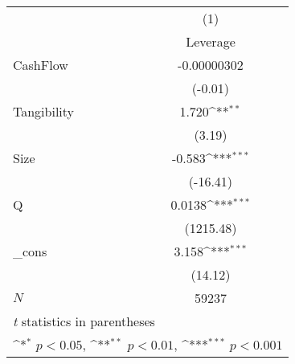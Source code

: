 {
\def\sym#1{\ifmmode^{#1}\else\(^{#1}\)\fi}
\begin{tabular}{l*{1}{c}}
\hline\hline
            &\multicolumn{1}{c}{(1)}\\
            &\multicolumn{1}{c}{Leverage}\\
\hline
CashFlow    & -0.00000302         \\
            &     (-0.01)         \\
[1em]
Tangibility &       1.720\sym{**} \\
            &      (3.19)         \\
[1em]
Size        &      -0.583\sym{***}\\
            &    (-16.41)         \\
[1em]
Q           &      0.0138\sym{***}\\
            &   (1215.48)         \\
[1em]
\_cons      &       3.158\sym{***}\\
            &     (14.12)         \\
\hline
\(N\)       &       59237         \\
\hline\hline
\multicolumn{2}{l}{\footnotesize \textit{t} statistics in parentheses}\\
\multicolumn{2}{l}{\footnotesize \sym{*} \(p<0.05\), \sym{**} \(p<0.01\), \sym{***} \(p<0.001\)}\\
\end{tabular}
}
